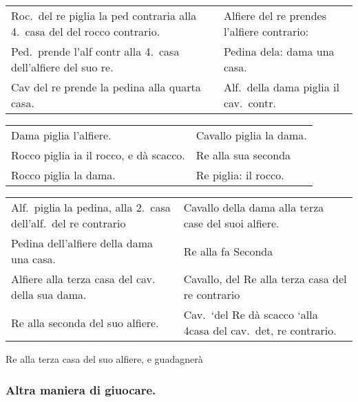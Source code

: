 \documentclass[11pt,a6paper]{article}
\begin{document}
{\noindent
\begin{tabular}{@{}p{3.84cm}p{3.84cm}}
Roc.\ del re piglia la ped contraria alla 4.\ casa del del rocco contrario.&Alfiere del re prendes l'alfiere contrario:\\
Ped.\ prende l'alf contr alla 4.\ casa dell'alfiere del suo re. &Pedina dela: dama una casa.\\
Cav del re prende la pedina alla quarta casa.&Alf.\ della dama piglia il cav.\ contr.\\
\end{tabular}
\noindent
\begin{tabular}{@{}p{3.84cm}p{3.84cm}}
Dama piglia l'alfiere. &Cavallo piglia la dama.\\
Rocco piglia ia il rocco, e dà scacco. &Re alla sua seconda~ \\
Rocco piglia la dama. &Re piglia: il rocco. \\
\end{tabular}
\noindent
\begin{tabular}{@{}p{3.84cm}p{3.84cm}}
Alf.\ piglia la pedina, alla 2.\ casa dell'alf.\ del re contrario &Cavallo della dama alla terza case del suoi alfiere. \\
Pedina dell'alfiere della dama una casa. &Re alla fa Seconda \\
Alfiere alla terza casa del cav. della sua dama.&Cavallo, del Re alla terza casa del re contrario\\
Re alla seconda del suo alfiere. &Cav.\ ‘del Re dà scacco ‘alla 4casa del cav.\ det, re contrario.\\
\end{tabular}
}
Re alla terza casa del suo alfiere, e guadagnerà





\subsubsection{Altra maniera di giuocare.}
\end{document}

